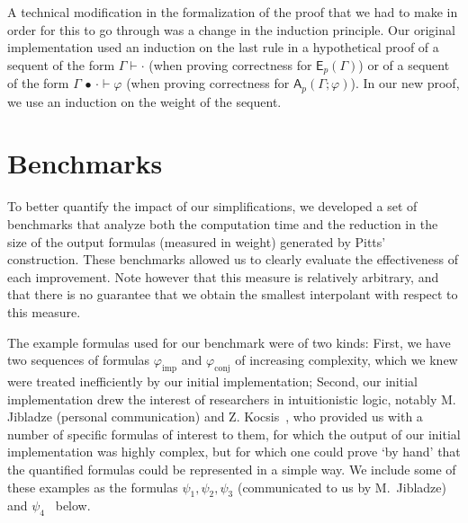 \documentclass[english,final]{jflart}
\theoremstyle{definition}
\theoremstyle{plain}
\newcommand{\Ap}[1]{\mathsf{A}_{p}(#1)}
\newcommand{\Ep}[1]{\mathsf{E}_{p}(#1)}
\renewcommand{\phi}{\varphi}
\newcommand{\cons}{\,\bullet\,}
\begin{document}
A technical modification in the formalization of the proof that we had to make in order for this to go through was a change in the induction principle. Our original implementation used an induction on the last rule in a hypothetical proof of a sequent of the form $\Gamma \vdash \cdot$ (when proving correctness for $\Ep{\Gamma}$) or of a sequent of the form $\Gamma \cons \cdot \vdash \phi$ (when proving correctness for $\Ap{\Gamma; \phi}$). In our new proof, we use an induction on the weight of the sequent.






\section{Benchmarks}\label{sec:benchmarks}
To better quantify the impact of our simplifications, we developed a set of benchmarks that analyze both the computation time and the reduction 
in the size of the output formulas (measured in weight) generated by Pitts' construction. These benchmarks allowed us to clearly evaluate the 
effectiveness of each improvement.
Note however that this measure is relatively arbitrary, and that there is no guarantee that we obtain the smallest interpolant with
respect to this measure.

The example formulas used for our benchmark were of two kinds: First, we have two sequences of formulas $\phi_{\text{imp}}$ and $\phi_{\text{conj}}$ of increasing complexity, which we knew were treated inefficiently by our initial implementation; Second, our initial implementation drew the interest of researchers in intuitionistic logic, notably M. Jibladze (personal communication) and Z. Kocsis~\cite{Koc2023}, who provided us with a number of specific formulas of interest to them, for which the output of our initial implementation was highly complex, but for which one could prove `by hand' that the quantified formulas could be represented in a simple way. We include some of these examples as the formulas $\psi_1, \psi_2, \psi_3$ (communicated to us by M.~Jibladze) and $\psi_4$~\cite[3.13]{Koc2023} below.
\end{document}
